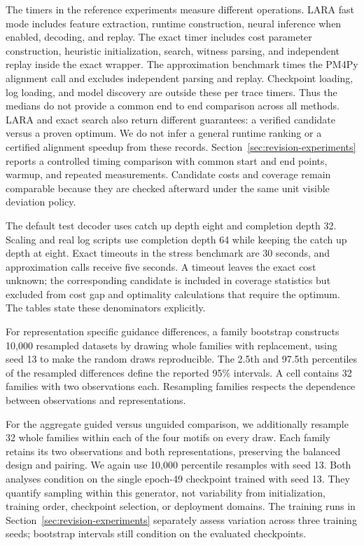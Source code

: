 \begin{revised}The timers in the reference experiments measure different operations. LARA fast mode includes feature extraction, runtime construction, neural inference when enabled, decoding, and replay. The exact timer includes cost parameter construction, heuristic initialization, search, witness parsing, and independent replay inside the exact wrapper. The approximation benchmark times the PM4Py alignment call and excludes independent parsing and replay. Checkpoint loading, log loading, and model discovery are outside these per trace timers. Thus the medians do not provide a common end to end comparison across all methods. LARA and exact search also return different guarantees: a verified candidate versus a proven optimum. We do not infer a general runtime ranking or a certified alignment speedup from these records. Section~\ref{sec:revision-experiments} reports a controlled timing comparison with common start and end points, warmup, and repeated measurements. Candidate costs and coverage remain comparable because they are checked afterward under the same unit visible deviation policy.\end{revised}

The default test decoder uses catch up depth eight and completion depth 32. Scaling and real log scripts use completion depth 64 while keeping the catch up depth at eight. Exact timeouts in the stress benchmark are 30 seconds, and approximation calls receive five seconds. A timeout leaves the exact cost unknown; the corresponding candidate is included in coverage statistics but excluded from cost gap and optimality calculations that require the optimum. The tables state these denominators explicitly.

For representation specific guidance differences, a family bootstrap constructs 10,000 resampled datasets by drawing whole families with replacement, using seed 13 to make the random draws reproducible. The 2.5th and 97.5th percentiles of the resampled differences define the reported 95\% intervals. A cell contains 32 families with two observations each. Resampling families respects the dependence between observations and representations. \begin{revised}For the aggregate guided versus unguided comparison, we additionally resample 32 whole families within each of the four motifs on every draw. Each family retains its two observations and both representations, preserving the balanced design and pairing. We again use 10,000 percentile resamples with seed 13. Both analyses condition on the single epoch-49 checkpoint trained with seed 13. They quantify sampling within this generator, not variability from initialization, training order, checkpoint selection, or deployment domains. The training runs in Section~\ref{sec:revision-experiments} separately assess variation across three training seeds; bootstrap intervals still condition on the evaluated checkpoints.\end{revised}


